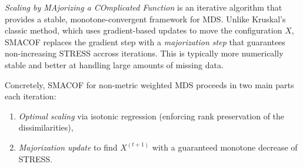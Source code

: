 \emph{Scaling by MAjorizing a COmplicated Function} is an iterative algorithm that provides a stable, monotone-convergent framework for MDS. Unlike Kruskal's classic method, which uses gradient-based updates to move the configuration $X$, SMACOF replaces the gradient step with a \emph{majorization step} that guarantees non-increasing STRESS accross iterations. This is typically more numerically stable and better at handling large amounts of missing data.

Concretely, SMACOF for non-metric weighted MDS proceeds in two main parts each iteration:
\begin{enumerate}
  \item \emph{Optimal scaling} via isotonic regression (enforcing rank preservation of the dissimilarities),
  \item \emph{Majorization update} to find $X^{(t+1)}$ with a guaranteed monotone decrease of STRESS.
\end{enumerate}


